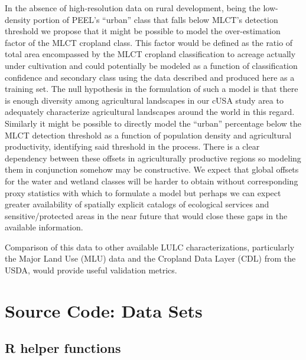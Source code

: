 \documentclass[draftthesis]{neiuthesis}
\begin{document}
In the absence of high-resolution data on rural development, being the
low-density portion of PEEL's ``urban'' class that falls below MLCT's
detection threshold we propose that it might be possible to model the
over-estimation factor of the MLCT cropland class.  This factor would
be defined as the ratio of total area encompassed by the MLCT cropland
classification to acreage actually under cultivation and could
potentially be modeled as a function of classification confidence and
secondary class using the data described and produced here as a
training set.  The null hypothesis in the formulation of such a model
is that there is enough diversity among agricultural landscapes in our
cUSA study area to adequately characterize agricultural landscapes
around the world in this regard.  Similarly it might be possible to
directly model the ``urban'' percentage below the MLCT detection
threshold as a function of population density and agricultural
productivity, identifying said threshold in the process.  There is a
clear dependency between these offsets in agriculturally productive
regions so modeling them in conjunction somehow may be
constructive.  We expect that global offsets for the water and
wetland classes will be harder to obtain without corresponding proxy
statistics with which to formulate a model but perhaps we can expect
greater availability of spatially explicit catalogs of ecological
services and sensitive/protected areas in the near future that would
close these gaps in the available information.


Comparison of this data to other available LULC characterizations,
particularly the Major Land Use (MLU) data and the Cropland Data Layer
(CDL) from the USDA, would provide useful validation metrics.


\backmatter



\appendix



\chapter{Source Code: Data Sets}

\section*{R helper functions}

\end{document}
